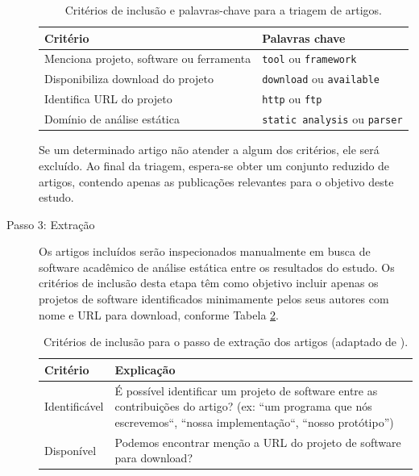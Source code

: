 \begin{description}
\begin{table}[h]
\caption{Critérios de inclusão e palavras-chave para a triagem de artigos.}
\centering
\begin{tabular}{ l l }
  \hline
  Critério                                 & Palavras chave                        \\
  \hline
  Menciona projeto, software ou ferramenta & {\tt tool} ou {\tt framework}         \\
  Disponibiliza download do projeto        & {\tt download} ou {\tt available}     \\
  Identifica URL do projeto                & {\tt http} ou {\tt ftp}               \\
  Domínio de análise estática              & {\tt static analysis} ou {\tt parser} \\
  \hline
\end{tabular}
\label{criterios-triagem}
\end{table}

Se um determinado artigo não atender a algum dos critérios, ele será
excluído. Ao final da triagem, espera-se obter um conjunto reduzido
de artigos, contendo apenas as publicações relevantes para o objetivo
deste estudo.

  \item [Passo 3: Extração]

Os artigos incluídos serão inspecionados manualmente em busca de software acadêmico de
análise estática entre os resultados do estudo. Os critérios de inclusão desta etapa têm
como objetivo incluir apenas os projetos de software identificados minimamente
pelos seus autores com nome e URL para download, conforme Tabela
\ref{criterios-extracao}.

\begin{table}[h]
\caption{Critérios de inclusão para o passo de extração dos artigos (adaptado de ).}
\centering
\begin{tabular}{ l p{12cm} }
  \hline
  Critério         & Explicação \\
  \hline
  Identificável    & É possível identificar um projeto de software entre as contribuições do artigo? (ex: ``um programa que nós escrevemos``, ``nossa implementação``, ``nosso protótipo'') \\
  Disponível       & Podemos encontrar menção a URL do projeto de software para download? \\
  \hline
\end{tabular}
\label{criterios-extracao}
\end{table}


\end{description}

